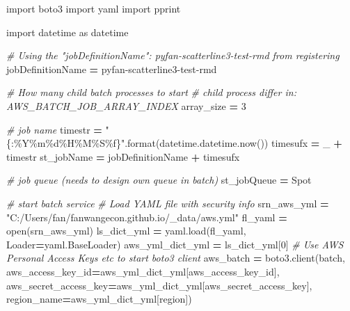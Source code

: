 \documentclass[
]{book}
\newenvironment{Shaded}{\begin{snugshade}}{\end{snugshade}}
\newcommand{\BuiltInTok}[1]{#1}
\newcommand{\CommentTok}[1]{\textcolor[rgb]{0.56,0.35,0.01}{\textit{#1}}}
\newcommand{\DecValTok}[1]{\textcolor[rgb]{0.00,0.00,0.81}{#1}}
\newcommand{\ImportTok}[1]{#1}
\newcommand{\NormalTok}[1]{#1}
\newcommand{\OperatorTok}[1]{\textcolor[rgb]{0.81,0.36,0.00}{\textbf{#1}}}
\newcommand{\SpecialCharTok}[1]{\textcolor[rgb]{0.00,0.00,0.00}{#1}}
\newcommand{\StringTok}[1]{\textcolor[rgb]{0.31,0.60,0.02}{#1}}
\begin{document}
\begin{Shaded}
\begin{Highlighting}[]
\ImportTok{import}\NormalTok{ boto3}
\ImportTok{import}\NormalTok{ yaml}
\ImportTok{import}\NormalTok{ pprint}

\ImportTok{import}\NormalTok{ datetime }\ImportTok{as}\NormalTok{ datetime}

\CommentTok{\# Using the "jobDefinitionName": \textquotesingle{}pyfan{-}scatterline3{-}test{-}rmd\textquotesingle{} from registering}
\NormalTok{jobDefinitionName }\OperatorTok{=} \StringTok{\textquotesingle{}pyfan{-}scatterline3{-}test{-}rmd\textquotesingle{}}

\CommentTok{\# How many child batch processes to start}
\CommentTok{\# child process differ in: AWS\_BATCH\_JOB\_ARRAY\_INDEX}
\NormalTok{array\_size }\OperatorTok{=} \DecValTok{3}

\CommentTok{\# job name}
\NormalTok{timestr }\OperatorTok{=} \StringTok{"\{:\%Y\%m}\SpecialCharTok{\%d}\StringTok{\%H\%M\%S}\SpecialCharTok{\%f}\StringTok{\}"}\NormalTok{.}\BuiltInTok{format}\NormalTok{(datetime.datetime.now())}
\NormalTok{timesufx }\OperatorTok{=} \StringTok{\textquotesingle{}\_\textquotesingle{}} \OperatorTok{+}\NormalTok{ timestr}
\NormalTok{st\_jobName }\OperatorTok{=}\NormalTok{ jobDefinitionName }\OperatorTok{+}\NormalTok{ timesufx}

\CommentTok{\# job queue (needs to design own queue in batch)}
\NormalTok{st\_jobQueue }\OperatorTok{=} \StringTok{\textquotesingle{}Spot\textquotesingle{}}

\CommentTok{\# start batch service}
\CommentTok{\# Load YAML file with security info}
\NormalTok{srn\_aws\_yml }\OperatorTok{=} \StringTok{"C:/Users/fan/fanwangecon.github.io/\_data/aws.yml"}
\NormalTok{fl\_yaml }\OperatorTok{=} \BuiltInTok{open}\NormalTok{(srn\_aws\_yml)}
\NormalTok{ls\_dict\_yml }\OperatorTok{=}\NormalTok{ yaml.load(fl\_yaml, Loader}\OperatorTok{=}\NormalTok{yaml.BaseLoader)}
\NormalTok{aws\_yml\_dict\_yml }\OperatorTok{=}\NormalTok{ ls\_dict\_yml[}\DecValTok{0}\NormalTok{]}
\CommentTok{\# Use AWS Personal Access Keys etc to start boto3 client}
\NormalTok{aws\_batch }\OperatorTok{=}\NormalTok{ boto3.client(}\StringTok{\textquotesingle{}batch\textquotesingle{}}\NormalTok{,}
\NormalTok{                         aws\_access\_key\_id}\OperatorTok{=}\NormalTok{aws\_yml\_dict\_yml[}\StringTok{\textquotesingle{}aws\_access\_key\_id\textquotesingle{}}\NormalTok{],}
\NormalTok{                         aws\_secret\_access\_key}\OperatorTok{=}\NormalTok{aws\_yml\_dict\_yml[}\StringTok{\textquotesingle{}aws\_secret\_access\_key\textquotesingle{}}\NormalTok{],}
\NormalTok{                         region\_name}\OperatorTok{=}\NormalTok{aws\_yml\_dict\_yml[}\StringTok{\textquotesingle{}region\textquotesingle{}}\NormalTok{])}


\end{Highlighting}
\end{Shaded}
\end{document}
